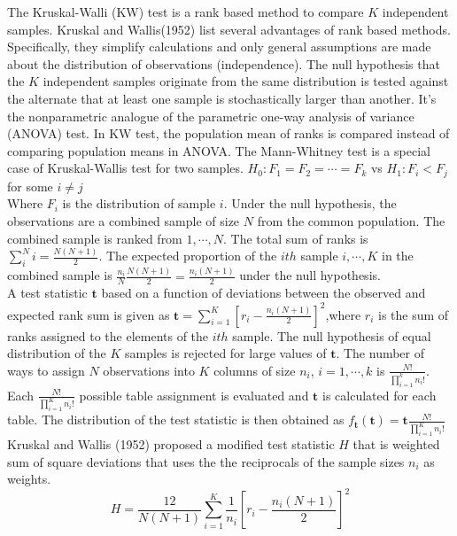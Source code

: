 \documentclass[12pt,oneside]{report}
\theoremstyle{definition}
\theoremstyle{mystyle}
\begin{document}
The Kruskal-Walli (KW) test is a rank based method to compare $K$ independent samples. Kruskal and Wallis(1952) list several advantages of rank based methods. Specifically, they simplify calculations and only general assumptions are made  about the distribution of observations (independence). The null hypothesis that the $K$ independent samples originate from the same distribution is tested against the alternate that at least one sample is stochastically larger than another. It's the nonparametric analogue of the  parametric one-way analysis of variance (ANOVA) test. In KW test, the population mean of ranks is compared instead of comparing population means in ANOVA.  The Mann-Whitney test is a special case of Kruskal-Wallis test for two samples.
$H_{0}:F_{1}=F_{2}=\cdots=F_{k}$ \textrm{vs}
$H_{1}:F_{i}<F_{j}$ for some $i\neq j$\\
Where $F_{i}$ is the distribution of sample $i$. Under the null hypothesis, the observations are a  combined sample of size $N$ from the common population. The combined sample  is ranked from $1,\cdots,N$. The  total sum of ranks is $\sum\limits_{i}^{N}i=\frac{N(N+1)}{2}$. The expected proportion of the $ith$ sample $i,\cdots,K$ in the combined sample is $\frac{n_{i}}{N}\frac{N(N+1)}{2}=\frac{n_{i}(N+1)}{2}$ under the null hypothesis.\\
A test statistic $\textbf{t}$ based on a function of deviations  between the observed and expected rank sum is given as $\textbf{t}=\sum\limits_{i=1}^{	K}\left[r_{i}-\frac{n_{i}(N+1)}{2}\right]^{2}$,where $r_{i}$ is the sum of ranks assigned to the elements of the $ith$ sample. The null hypothesis of equal distribution of the $K$ samples is rejected for large values of $\textbf{t}$. The number of ways to assign $N$ observations into $K$ columns of size $n_{i}$, $i=1,\cdots,k$ is $\frac{N!}{\prod\limits_{i=1}^{k}n_{i}!}$. Each $\frac{N!}{\prod\limits_{i=1}^{K}n_{i}!}$ possible table  assignment is evaluated and $\textbf{t}$ is calculated for each table. The distribution of the test statistic is then obtained as  $f_{\textbf{t}}(\textbf{t})=\displaystyle \textbf{t}\frac{N!}{\prod\limits_{i=1}^{K}n_{i}!}$\\
\vspace{5mm}
Kruskal and Wallis (1952) proposed a modified test statistic $H$  that is weighted sum of square deviations that uses the the reciprocals of the sample sizes $n_{i}$ as weights.\\
\begin{equation}
H=\frac{12}{N(N+1)}\sum\limits_{i=1}^{K}\frac{1}{n_{i}}\left[r_{i}-\frac{n_{i}(N+1)}{2}\right]^{2}
\end{equation}
\end{document}
